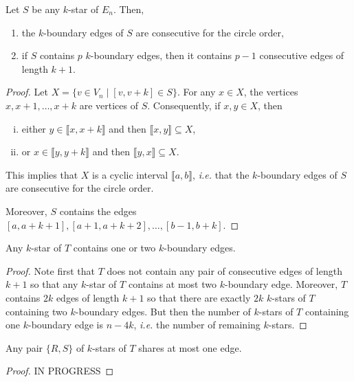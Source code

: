 \documentclass[12pt]{amsart}
\begin{document}
\begin{lemma}
Let $S$ be any $k$-star of $E_n$. Then, 
\begin{enumerate}
\item the $k$-boundary edges of $S$ are consecutive for the circle order,
\item if $S$ contains $p$ $k$-boundary edges, then it contains $p-1$ consecutive edges of length $k+1$.
\end{enumerate}
\end{lemma}

\begin{proof}
Let $X=\{v\in V_n\;|\; [v,v+k]\in S\}$. For any $x\in X$, the vertices $x,x+1,\ldots,x+k$ are vertices of $S$. Consequently, if $x,y\in X$, then 
\begin{enumerate}[(i)]
\item either $y\in\llbracket x, x+k\rrbracket$ and then $\llbracket x, y\rrbracket\subseteq X$,
\item or $x\in\llbracket y, y+k\rrbracket$ and then $\llbracket y,x\rrbracket\subseteq X$.
\end{enumerate}
This implies that $X$ is a cyclic interval $\llbracket a,b\rrbracket$, {\it i.e.} that the $k$-boundary edges of $S$ are consecutive for the circle order.

Moreover, $S$ contains the edges $[a,a+k+1],[a+1,a+k+2],\ldots, [b-1,b+k]$.
\end{proof}

\begin{lemma}
Any $k$-star of $T$ contains one or two $k$-boundary edges.
\end{lemma}

\begin{proof}
Note first that $T$ does not contain any pair of consecutive edges of length $k+1$ so that any $k$-star of $T$ contains at most two $k$-boundary edge. Moreover, $T$ contains $2k$ edges of length $k+1$ so that there are exactly $2k$ $k$-stars of $T$ containing two $k$-boundary edges. But then the number of $k$-stars of $T$ containing one $k$-boundary edge is $n-4k$, {\it i.e.} the number of remaining $k$-stars.
\end{proof}

\begin{lemma}
Any pair $\{R,S\}$ of $k$-stars of $T$ shares at most one edge. 
\end{lemma}

\begin{proof}
IN PROGRESS
\end{proof}
\end{document}
